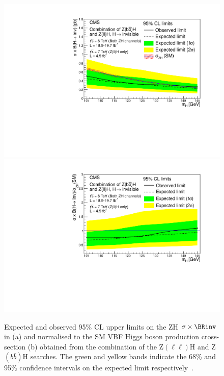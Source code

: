 \begin{figure}
  \includegraphics[width=.65\largefigwidth]{plots/prompt/HIG-13-30-figs/zhxslimit.pdf}
  \includegraphics[width=.65\largefigwidth]{plots/prompt/HIG-13-30-figs/zhlimit.pdf}
  \caption{Expected and observed 95\% \ac{CL} upper limits on the \ac{ZH} $\sigma\times\BRinv$ in \pb (a) and normalised to the SM \ac{VBF} Higgs boson production cross-section (b) obtained from the combination of the Z$(\ell\ell)$H and Z$(b\bar{b})$H searches. The green and yellow bands indicate the 68\% and 95\% confidence intervals on the expected limit respectively~\cite{Chatrchyan:2014tja}.}
  \label{fig:zhcomb}
\end{figure}

